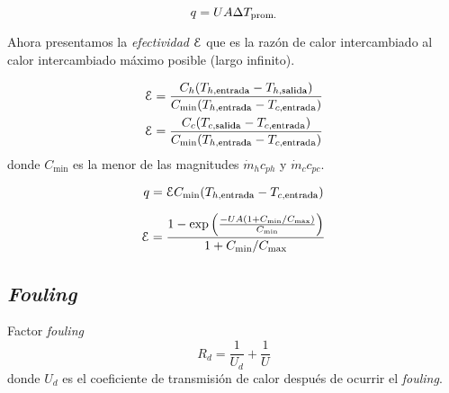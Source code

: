 \begin{equation}
    q=UA\Delta T_{\textrm{prom.}}
\end{equation}

Ahora presentamos la \emph{efectividad} $\mathcal{E}$ que es la razón de calor intercambiado al calor intercambiado máximo posible (largo infinito).


\begin{align}
    \efic &= \frac{C_h (T_{h,\entrada}-T_{h,\salida})}{C_{\min}(T_{h,\entrada}-T_{c,\entrada})} \\
\efic &= \frac{C_c (T_{c,\salida}-T_{c,\entrada})}{C_{\min}(T_{h,\entrada}-T_{c,\entrada})} 
\end{align}
donde $C_{\min}$ es la menor de las magnitudes $\dot{m}_h c_{ph}$ y $\dot{m}_c c_{pc}$.

\begin{equation}
    q= \efic C_{\min}(T_{h,\entrada}-T_{c,\entrada})
\end{equation}

\begin{equation}
    \mathcal{E} = \frac{1-\exp\left(\frac{-UA(1+C_{\min}/C_{\max})}{C_{\min}}\right)}{1+C_{\min}/C_{\max}}
\end{equation}


\subsection{\textit{Fouling}}

Factor \emph{fouling}
\begin{equation}
    R_d=\frac{1}{U_d}+\frac{1}{U}
\end{equation}
donde $U_d$ es el coeficiente de transmisión de calor después de ocurrir el \emph{fouling}.